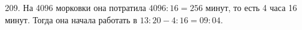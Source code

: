209. На 4096 морковки она потратила $4096:16=256$ минут, то есть 4 часа 16 минут. Тогда она начала работать в  $13:20-4:16=09:04.$\\
